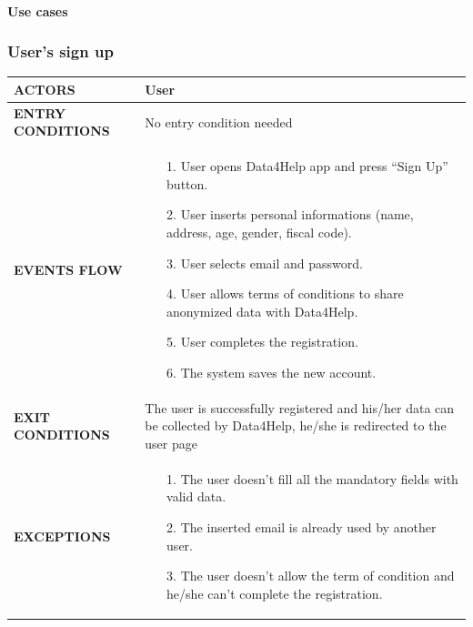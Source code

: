 \documentclass[a4paper]{article}
\begin{document}
    
    \paragraph{Use cases}

\subsubsection{User's sign up}
\begin{center}
    \begin{tabular}{ l || p{8cm} ||}
        \bf{ACTORS} & User \\ 
        \hline
        \bf{ENTRY CONDITIONS} & No entry condition needed  \\ 
        \hline
        \bf{EVENTS FLOW} & \begin{itemize}[noitemsep, topsep=0cm, leftmargin=*] \vspace{-0.2cm}
            \item[1.] User opens Data4Help app and press “Sign Up” button.
            \item[2.] User inserts personal informations (name, address, age, gender, fiscal code).
            \item[3.] User selects email and password.
            \item[4.] User allows terms of conditions to share anonymized data with Data4Help.
            \item[5.] User completes the registration.
            \item[6.] The system saves the new account.
        \end{itemize}\\ 
        \hline
        \bf{EXIT CONDITIONS} & The user is successfully registered and his/her data can be collected by Data4Help, he/she is redirected to the user page\\ \hline
        \bf{EXCEPTIONS} & \begin{itemize}[noitemsep, topsep=0cm, leftmargin=*] \vspace{-0.2cm}
            \item[1.] The user doesn’t fill all the mandatory fields with valid data.
            \item[2.]The inserted email is already used by another user.
            \item[3.] The user doesn’t allow the term of condition and he/she can’t complete the registration.
        \end{itemize}
        \\ \hline \hline
    \end{tabular}
\end{center}
\end{document}
